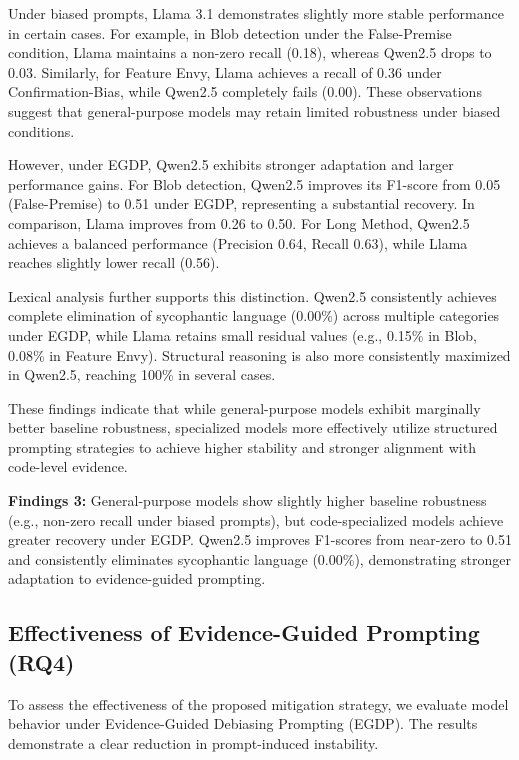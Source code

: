 \documentclass[sigconf,review,anonymous]{acmart}
\begin{document}
Under biased prompts, Llama 3.1 demonstrates slightly more stable performance in certain cases. For example, in Blob detection under the False-Premise condition, Llama maintains a non-zero recall (0.18), whereas Qwen2.5 drops to 0.03. Similarly, for Feature Envy, Llama achieves a recall of 0.36 under Confirmation-Bias, while Qwen2.5 completely fails (0.00). These observations suggest that general-purpose models may retain limited robustness under biased conditions.

However, under EGDP, Qwen2.5 exhibits stronger adaptation and larger performance gains. For Blob detection, Qwen2.5 improves its F1-score from 0.05 (False-Premise) to 0.51 under EGDP, representing a substantial recovery. In comparison, Llama improves from 0.26 to 0.50. For Long Method, Qwen2.5 achieves a balanced performance (Precision 0.64, Recall 0.63), while Llama reaches slightly lower recall (0.56).

Lexical analysis further supports this distinction. Qwen2.5 consistently achieves complete elimination of sycophantic language (0.00\%) across multiple categories under EGDP, while Llama retains small residual values (e.g., 0.15\% in Blob, 0.08\% in Feature Envy). Structural reasoning is also more consistently maximized in Qwen2.5, reaching 100\% in several cases.

These findings indicate that while general-purpose models exhibit marginally better baseline robustness, specialized models more effectively utilize structured prompting strategies to achieve higher stability and stronger alignment with code-level evidence.

\begin{summarybox}
\textbf{Findings 3:}
General-purpose models show slightly higher baseline robustness (e.g., non-zero recall under biased prompts), but code-specialized models achieve greater recovery under EGDP. Qwen2.5 improves F1-scores from near-zero to 0.51 and consistently eliminates sycophantic language (0.00\%), demonstrating stronger adaptation to evidence-guided prompting.
\end{summarybox}



\subsection{Effectiveness of Evidence-Guided Prompting (RQ4)}

To assess the effectiveness of the proposed mitigation strategy, we evaluate model behavior under Evidence-Guided Debiasing Prompting (EGDP). The results demonstrate a clear reduction in prompt-induced instability.
\end{document}
